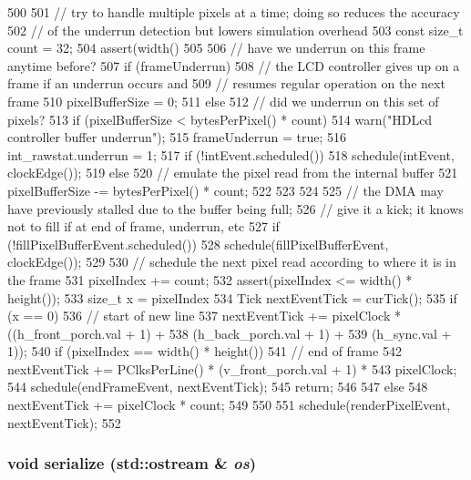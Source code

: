 \begin{DoxyCode}
500 {
501     // try to handle multiple pixels at a time; doing so reduces the accuracy
502     //   of the underrun detection but lowers simulation overhead
503     const size_t count = 32;
504     assert(width() %
505 
506     // have we underrun on this frame anytime before?
507     if (frameUnderrun) {
508         // the LCD controller gives up on a frame if an underrun occurs and
509         //   resumes regular operation on the next frame
510         pixelBufferSize = 0;
511     } else {
512         // did we underrun on this set of pixels?
513         if (pixelBufferSize < bytesPerPixel() * count) {
514             warn("HDLcd controller buffer underrun\n");
515             frameUnderrun = true;
516             int_rawstat.underrun = 1;
517             if (!intEvent.scheduled())
518                 schedule(intEvent, clockEdge());
519         } else {
520             // emulate the pixel read from the internal buffer
521             pixelBufferSize -= bytesPerPixel() * count;
522         }
523     }
524 
525     // the DMA may have previously stalled due to the buffer being full;
526     //   give it a kick; it knows not to fill if at end of frame, underrun, etc
527     if (!fillPixelBufferEvent.scheduled())
528         schedule(fillPixelBufferEvent, clockEdge());
529 
530     // schedule the next pixel read according to where it is in the frame
531     pixelIndex += count;
532     assert(pixelIndex <= width() * height());
533     size_t x = pixelIndex %
534     Tick nextEventTick = curTick();
535     if (x == 0) {
536         // start of new line
537         nextEventTick += pixelClock * ((h_front_porch.val + 1) +
538                                        (h_back_porch.val + 1) +
539                                        (h_sync.val + 1));
540         if (pixelIndex == width() * height()) {
541             // end of frame
542             nextEventTick += PClksPerLine() * (v_front_porch.val + 1) *
543                              pixelClock;
544             schedule(endFrameEvent, nextEventTick);
545             return;
546         }
547     } else {
548         nextEventTick += pixelClock * count;
549     }
550 
551     schedule(renderPixelEvent, nextEventTick);
552 }
\end{DoxyCode}
\hypertarget{classHDLcd_a53e036786d17361be4c7320d39c99b84}{
\subsubsection[{serialize}]{\setlength{\rightskip}{0pt plus 5cm}void serialize (std::ostream \& {\em os})}}
\label{classHDLcd_a53e036786d17361be4c7320d39c99b84}


